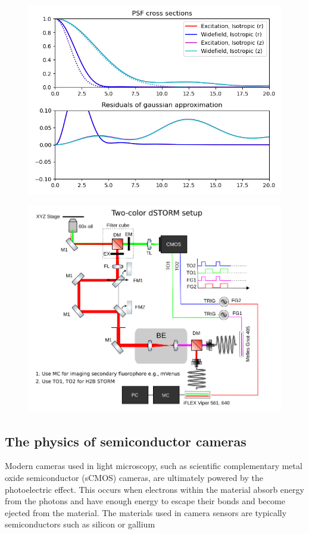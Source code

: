 \documentclass{ucetd}
\begin{document}
\begin{figure}[t!]
\centering
\includegraphics[width=150mm]{psf-2}
\end{figure}

\begin{figure}[t!]
\centering
\includegraphics[width=150mm]{dSTORM}
\end{figure}

\subsection{The physics of semiconductor cameras}

Modern cameras used in light microscopy, such as scientific complementary metal oxide semiconductor (sCMOS) cameras, are ultimately powered by the photoelectric effect. This occurs when electrons within the material absorb energy from the photons and have enough energy to escape their bonds and become ejected from the material. The materials used in camera sensors are typically semiconductors such as silicon or gallium
\end{document}
